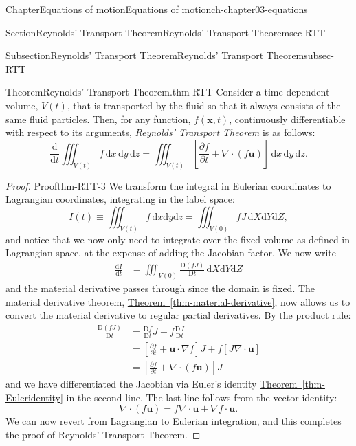 \documentclass[oneside,10pt,]{book}
\newcommand{\xreffont}{\relax}
\numberwithin{equation}{section}
\newcommand{\de}{\mathrm{d}}
\newcommand{\dd}[2]{\frac{\de#1}{\de#2}}
\newcommand{\DD}[2]{\frac{\mathrm{D}#1}{\mathrm{D}#2}}
\newcommand{\pd}[2]{\frac{\partial#1}{\partial#2}}
\newcommand{\bx}{\boldsymbol{x}}
\newcommand{\bu}{\boldsymbol{u}}
\begin{document}
\begin{chapterptx}{Chapter}{Equations of motion}{}{Equations of motion}{}{}{ch-chapter03-equations}
\begin{sectionptx}{Section}{Reynolds' Transport Theorem}{}{Reynolds' Transport Theorem}{}{}{sec-RTT}
\begin{subsectionptx}{Subsection}{Reynolds' Transport Theorem}{}{Reynolds' Transport Theorem}{}{}{subsec-RTT}
\begin{theorem}{Theorem}{Reynolds' Transport Theorem.}{}{thm-RTT}%
Consider a time-dependent volume, \(V(t)\), that is transported by the fluid so that it always consists of the same fluid particles. Then, for any function, \(f(\bx,
t)\), continuously differentiable with respect to its arguments, \emph{Reynolds' Transport Theorem} is as follows:%
\begin{equation}
\dd{}{t} \iiint_{V(t)} f \, \de{x} \, \de{y} \, \de{z} = \iiint_{V(t)} \left[
\pd{f}{t} + \nabla \cdot (f\bu)\right] \, \de{x} \, \de{y} \, \de{z}.\label{eqn-RTT}
\end{equation}
%
\end{theorem}
\begin{proof}{Proof}{}{thm-RTT-3}
We transform the integral in Eulerian coordinates to Lagrangian coordinates, integrating in the label space:%
\begin{equation*}
I(t) \equiv \iiint_{V(t)} f \, \de{x} \de{y} \de{z}
= \iiint_{V(0)} f J \, \de{X} \de{Y} \de{Z},
\end{equation*}
and notice that we now only need to integrate over the fixed volume as defined in Lagrangian space, at the expense of adding the Jacobian factor. We now write%
\begin{align*}
\dd{I}{t} &= \iiint_{V(0)} \DD{(fJ)}{t} \, \de{X}\de{Y}\de{Z} 
\end{align*}
and the material derivative passes through since the domain is fixed. The material derivative theorem, \hyperref[thm-material-derivative]{Theorem~{\xreffont\ref{thm-material-derivative}}}, now allows us to convert the material derivative to regular partial derivatives. By the product rule:%
\begin{align*}
\DD{(fJ)}{t} &= \DD{f}{t}J + f\DD{J}{t} \\
&= \left[ \pd{f}{t} + \bu \cdot \nabla f\right]J
+ f \left[J \nabla \cdot \bu\right] \\
&= \left[ \pd{f}{t} + \nabla \cdot (f\bu) \right]J 
\end{align*}
and we have differentiated the Jacobian via Euler's identity \hyperref[thm-Euleridentity]{Theorem~{\xreffont\ref{thm-Euleridentity}}} in the second line. The last line follows from the vector identity:%
\begin{equation*}
\nabla \cdot (f\bu) = f \nabla \cdot \bu + \nabla f \cdot \bu.
\end{equation*}
We can now revert from Lagrangian to Eulerian integration, and this completes the proof of Reynolds' Transport Theorem.%

\end{proof}
\end{subsectionptx}
\end{sectionptx}
\end{chapterptx}
\end{document}
